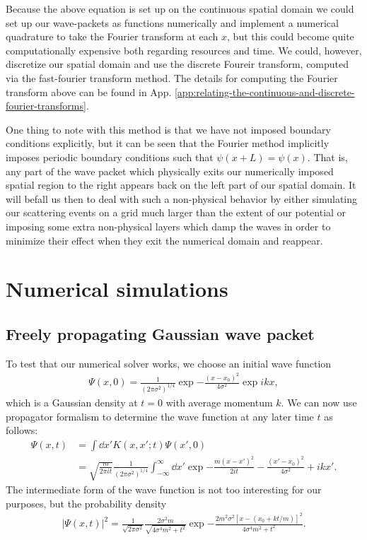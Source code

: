 Because the above equation is set up on the continuous spatial domain we could set up our wave-packets as functions numerically and implement a numerical quadrature to take the Fourier transform at each $x$, but this could become quite computationally expensive both regarding resources and time.
We could, however, discretize our spatial domain and use the discrete Foureir transform, computed via the fast-fourier transform method.
The details for computing the Fourier transform above can be found in App. \ref{app:relating-the-continuous-and-discrete-fourier-transforms}.

One thing to note with this method is that we have not imposed boundary conditions explicitly, but it can be seen that the Fourier method implicitly imposes periodic boundary conditions such that $\psi(x + L) = \psi(x)$.
That is, any part of the wave packet which physically exits our numerically imposed spatial region to the right appears back on the left part of our spatial domain.
It will befall us then to deal with such a non-physical behavior by either simulating our scattering events on a grid much larger than the extent of our potential or imposing some extra non-physical layers which damp the waves in order to minimize their effect when they exit the numerical domain and reappear.



\section{Numerical simulations}
\label{sec:numerical-simulations}

\subsection{Freely propagating Gaussian wave packet}
\label{ssec:freely-propagating-gaussian-wave-packet}

To test that our numerical solver works, we choose an initial wave function
\begin{align}
    \Psi(x,0) = \frac{1}{(2 \pi \sigma^2)^{1/4}} \exp{-\frac{(x - x_{0})^2}{4 \sigma^2}} \exp{i k x}
,\end{align}
which is a Gaussian density at $t = 0$ with average momentum $k$.
We can now use propagator formalism to determine the wave function at any later time $t$ as follows:
\begin{align}
\label{eq:gauss-wave-prop}
    \Psi(x,t) &= \int \dd{x'} K(x,x';t) \Psi(x',0) \nonumber \\
              &= \sqrt{\frac{m}{2 \pi i t}} \frac{1}{(2 \pi \sigma^2)^{1/4}} \int_{-\infty}^{\infty} \dd{x'} \exp{-\frac{m(x - x')^2}{2 i t} - \frac{(x' - x_0)^2}{4 \sigma^2} + i k x'}
.\end{align}
The intermediate form of the wave function is not too interesting for our purposes, but the probability density
\begin{align}
    |\Psi(x,t)|^2 = \frac{1}{\sqrt{2 \pi \sigma^2}} \frac{2 \sigma^2 m}{\sqrt{ 4 \sigma^4 m^2 + t^2 }} \exp{ -\frac{2 m^2 \sigma^2 [ x - (x_0 + k t / m) ]^2}{4 \sigma^{4} m^2 + t^2} }
.\end{align}



